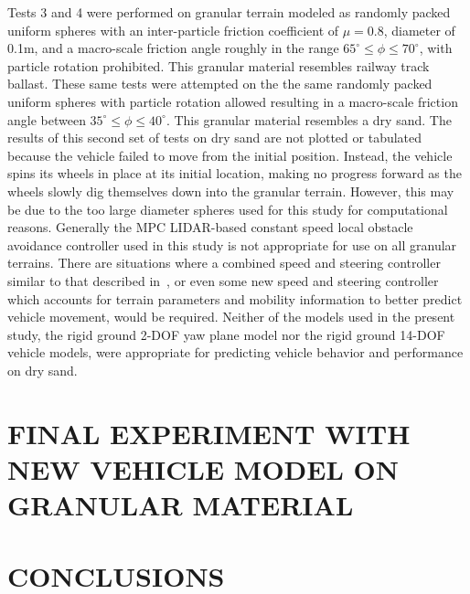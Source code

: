 \documentclass[12pt,onecolumn]{article}
\begin{document}
Tests 3 and 4 were performed on granular terrain modeled as randomly packed uniform spheres with an inter-particle friction coefficient of $\mu = 0.8$, diameter of 0.1m, and a macro-scale friction angle roughly in the range $65^\circ \leq \phi \leq 70^\circ$, with particle rotation prohibited. This granular material resembles railway track ballast. These same tests were attempted on the the same randomly packed uniform spheres with particle rotation allowed resulting in a macro-scale friction angle between $35^\circ \leq \phi \leq 40^\circ$. This granular material resembles a dry sand. The results of this second set of tests on dry sand are not plotted or tabulated because the vehicle failed to move from the initial position. Instead, the vehicle spins its wheels in place at its initial location, making no progress forward as the wheels slowly dig themselves down into the granular terrain. However, this may be due to the too large diameter spheres used for this study for computational reasons. Generally the MPC LIDAR-based constant speed local obstacle avoidance controller used in this study is not appropriate for use on all granular terrains. There are situations where a combined speed and steering controller similar to that described in~\cite{SpeedSteer2015}, or even some new speed and steering controller which accounts for terrain parameters and mobility information to better predict vehicle movement, would be required. Neither of the models used in the present study, the rigid ground 2-DOF yaw plane model nor the rigid ground 14-DOF vehicle models, were appropriate for predicting vehicle behavior and performance on dry sand.


\section{FINAL EXPERIMENT WITH NEW VEHICLE MODEL ON GRANULAR MATERIAL}\label{s:finalResults}


\section{CONCLUSIONS}\label{s:conclusion}
\end{document}
